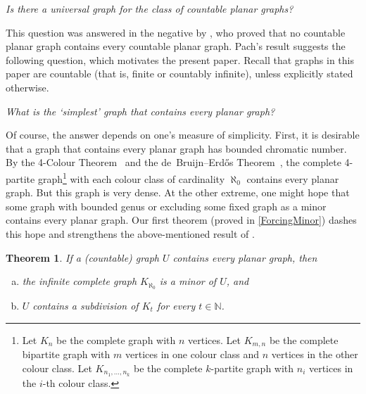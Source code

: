 \documentclass[a4paper,11pt]{article}
\theoremstyle{plain}
\newtheorem{thm}{Theorem}[section]
\theoremstyle{definition}
\newcommand{\NN}{\mathbb{N}}
\begin{document}

\emph{Is there a universal graph for the class of countable planar graphs?}

This question was answered in the negative by \citet{Pach81a}, who proved that no countable planar graph contains every countable planar graph. Pach's result suggests the following question, which motivates the present paper. Recall that graphs in this paper are countable (that is, finite or countably infinite), unless explicitly stated otherwise. 

\emph{What is the `simplest' graph that contains every planar graph?}

Of course, the answer depends on one's measure of simplicity. First, it is desirable that a graph that  contains every planar graph has bounded chromatic number. By the 4-Colour Theorem~\citep{AH89,RSST97} and the de~Bruijn--Erd\H{o}s Theorem~\citep{dBE51}, the complete 4-partite graph\footnote{Let $K_n$ be the complete graph with $n$ vertices. Let $K_{m,n}$ be the complete bipartite graph with $m$ vertices in one colour class and $n$ vertices in the other colour class. Let $K_{n_1,\dots,n_k}$ be the complete $k$-partite graph with $n_i$ vertices in the $i$-th colour class.} with each colour class of cardinality $\aleph_0$  contains every planar graph. But this graph is very dense. At the other extreme, one might hope that some graph with bounded genus or excluding some fixed graph as a minor contains every planar graph. Our first theorem (proved in \cref{ForcingMinor}) dashes this hope and strengthens the above-mentioned result of \citet{Pach81a}.

\begin{thm}
\label{InfinteCliqueMinor}
If a (countable) graph $U$ contains every planar graph, then 
\begin{enumerate}[(a)]
\item the infinite complete graph $K_{\aleph_0}$ is a minor of $U$, and
\item $U$ contains a subdivision of $K_t$ for every $t\in\NN$. 
\end{enumerate}
\end{thm}
\end{document}
